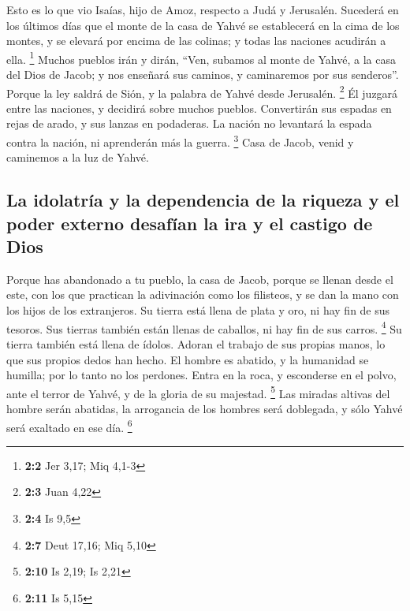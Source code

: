\begin{paracol}{2}
 Esto es lo que vio Isaías, hijo de Amoz, respecto a Judá
y Jerusalén.  Sucederá en los últimos días que el monte de
la casa de Yahvé se establecerá en la cima de los montes, y se elevará
por encima de las colinas; y todas las naciones acudirán a ella.
\footnote{\textbf{2:2} Jer 3,17; Miq 4,1-3}  Muchos
pueblos irán y dirán, ``Ven, subamos al monte de Yahvé, a la casa del
Dios de Jacob; y nos enseñará sus caminos, y caminaremos por sus
senderos''. Porque la ley saldrá de Sión, y la palabra de Yahvé desde
Jerusalén. \footnote{\textbf{2:3} Juan 4,22}  Él juzgará
entre las naciones, y decidirá sobre muchos pueblos. Convertirán sus
espadas en rejas de arado, y sus lanzas en podaderas. La nación no
levantará la espada contra la nación, ni aprenderán más la guerra.
\footnote{\textbf{2:4} Is 9,5}  Casa de Jacob, venid y
caminemos a la luz de Yahvé.

\hypertarget{la-idolatruxeda-y-la-dependencia-de-la-riqueza-y-el-poder-externo-desafuxedan-la-ira-y-el-castigo-de-dios}{%
\subsection{La idolatría y la dependencia de la riqueza y el poder
externo desafían la ira y el castigo de
Dios}\label{la-idolatruxeda-y-la-dependencia-de-la-riqueza-y-el-poder-externo-desafuxedan-la-ira-y-el-castigo-de-dios}}

 Porque has abandonado a tu pueblo, la casa de Jacob,
porque se llenan desde el este, con los que practican la adivinación
como los filisteos, y se dan la mano con los hijos de los extranjeros.
 Su tierra está llena de plata y oro, ni hay fin de sus
tesoros. Sus tierras también están llenas de caballos, ni hay fin de sus
carros. \footnote{\textbf{2:7} Deut 17,16; Miq 5,10}  Su
tierra también está llena de ídolos. Adoran el trabajo de sus propias
manos, lo que sus propios dedos han hecho.  El hombre es
abatido, y la humanidad se humilla; por lo tanto no los perdones.
 Entra en la roca, y esconderse en el polvo, ante el
terror de Yahvé, y de la gloria de su majestad. \footnote{\textbf{2:10}
  Is 2,19; Is 2,21}  Las miradas altivas del hombre serán
abatidas, la arrogancia de los hombres será doblegada, y sólo Yahvé será
exaltado en ese día. \footnote{\textbf{2:11} Is 5,15}

\hypertarget{anuncio-del-juicio-de-dios-sobre-toda-la-soberanuxeda-terrenal-y-el-orgullo-humano}{%
}
\end{paracol}
